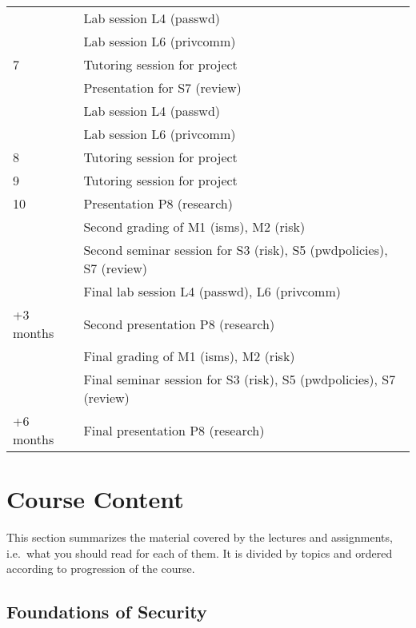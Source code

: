 \documentclass[a4paper]{llncs}
\begin{document}
\begin{table}
\begin{tabular}{lp{9cm}}
      & Lab session L4 (passwd)\\
      & Lab session L6 (privcomm)\\
    \midrule
    7
      & Tutoring session for project\\
      & Presentation for S7 (review)\\
      & Lab session L4 (passwd)\\
      & Lab session L6 (privcomm)\\
    \midrule
    8
      & Tutoring session for project\\
    \midrule
    9
      & Tutoring session for project\\
    \midrule
    10
      & Presentation P8 (research)\\
      & Second grading of M1 (isms), M2 (risk)\\
      & Second seminar session for S3 (risk), S5 (pwdpolicies), S7 (review)\\
      & Final lab session L4 (passwd), L6 (privcomm)\\
    \midrule
    +3 months
      & Second presentation P8 (research)\\
      & Final grading of M1 (isms), M2 (risk)\\
      & Final seminar session for S3 (risk), S5 (pwdpolicies), S7 (review)\\
    \midrule
    +6 months
      & Final presentation P8 (research)\\
    \bottomrule
  \end{tabular}
\end{table}


\section{Course Content}

This section summarizes the material covered by the lectures and assignments, 
i.e.~what you should read for each of them.
It is divided by topics and ordered according to progression of the course.

\subsection{Foundations of Security}


%
%
\end{document}
